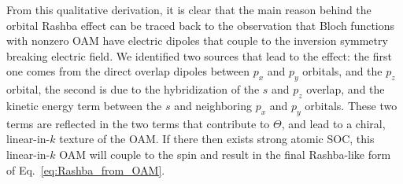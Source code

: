 From this qualitative derivation, it is clear that the main reason behind the orbital Rashba effect can be traced back to the observation that Bloch functions with nonzero OAM have electric dipoles that couple to the inversion symmetry breaking electric field. We identified two sources that lead to the effect: the first one comes from the direct overlap dipoles between $p_x$ and $p_y$ orbitals, and the $p_z$ orbital\cite{Petersen2000}, the second is due to the hybridization of the $s$ and $p_z$ overlap, and the kinetic energy term between the $s$ and neighboring $p_x$ and $p_y$ orbitals\cite{Go2016}. These two terms are reflected in the two terms that contribute to $\Theta$, and lead to a chiral, linear-in-$k$ texture of the OAM.
If there then exists strong atomic SOC, this linear-in-$k$ OAM will couple to the spin and result in the final Rashba-like form of Eq.~\ref{eq:Rashba_from_OAM}.

